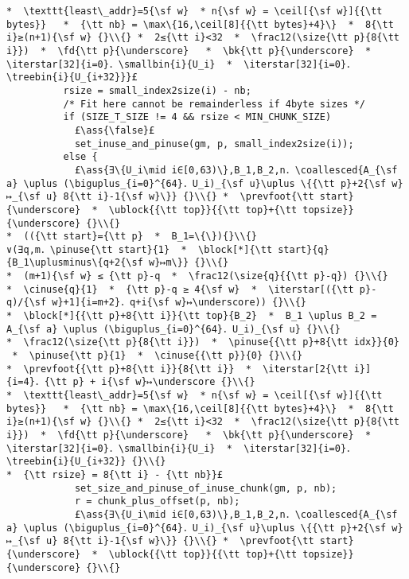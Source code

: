 \documentclass[10pt,twoside]{report}
\makeatletter
\newcommand{\ml}[2][t]{\mbox{\mdseries\begin{tabular}[#1]{@{}L@{}}#2\end{tabular}}}
\newcommand{\ass}[1]{\ensuremath{{\color{blue}\left\{\ml[c]{#1}\right\}}}}
\renewcommand{\ceil}[2][]{\left\lceil{#2}\right\rceil_{#1}}
\newcommand{\iterstar}[2][]{\text{\LARGE $*$}^{#1}_{#2}}
\makeatother
\begin{document}
\begin{lstlisting}
*  \texttt{least\_addr}=5{\sf w}  * n{\sf w} = \ceil[{\sf w}]{{\tt bytes}}   *  {\tt nb} = \max\{16,\ceil[8]{{\tt bytes}+4}\}  *  8{\tt i}≥(n+1){\sf w} {}\\{} *  2≤{\tt i}<32  *  \frac12(\size{\tt p}{8{\tt i}})  *  \fd{\tt p}{\underscore}   *  \bk{\tt p}{\underscore}  *  \iterstar[32]{i=0}．\smallbin{i}{U_i}  *  \iterstar[32]{i=0}．\treebin{i}{U_{i+32}}}£ 
          rsize = small_index2size(i) - nb;
          /* Fit here cannot be remainderless if 4byte sizes */
          if (SIZE_T_SIZE != 4 && rsize < MIN_CHUNK_SIZE)
            £\ass{\false}£
            set_inuse_and_pinuse(gm, p, small_index2size(i));
          else {
            £\ass{∃\{U_i\mid i∈[0,63)\},B_1,B_2,n．\coallesced{A_{\sf a} \uplus (\biguplus_{i=0}^{64}．U_i)_{\sf u}\uplus \{{\tt p}+2{\sf w}↦_{\sf u} 8{\tt i}-1{\sf w}\}} {}\\{} *  \prevfoot{\tt start}{\underscore}  *  \ublock{{\tt top}}{{\tt top}+{\tt topsize}}{\underscore} {}\\{}
*  (({\tt start}={\tt p}  *  B_1=\{\}){}\\{}
∨(∃q,m．\pinuse{\tt start}{1}  *  \block[*]{\tt start}{q}{B_1\uplusminus\{q+2{\sf w}↦m\}} {}\\{}
*  (m+1){\sf w} ≤ {\tt p}-q  *  \frac12(\size{q}{{\tt p}-q}) {}\\{}
*  \cinuse{q}{1}  *  {\tt p}-q ≥ 4{\sf w}  *  \iterstar[({\tt p}-q)/{\sf w}+1]{i=m+2}．q+i{\sf w}↦\underscore)) {}\\{}
*  \block[*]{{\tt p}+8{\tt i}}{\tt top}{B_2}  *  B_1 \uplus B_2 = A_{\sf a} \uplus (\biguplus_{i=0}^{64}．U_i)_{\sf u} {}\\{}
*  \frac12(\size{\tt p}{8{\tt i}})  *  \pinuse{{\tt p}+8{\tt idx}}{0}  *  \pinuse{\tt p}{1}  *  \cinuse{{\tt p}}{0} {}\\{}
*  \prevfoot{{\tt p}+8{\tt i}}{8{\tt i}}  *  \iterstar[2{\tt i}]{i=4}．{\tt p} + i{\sf w}↦\underscore {}\\{}
*  \texttt{least\_addr}=5{\sf w}  * n{\sf w} = \ceil[{\sf w}]{{\tt bytes}}   *  {\tt nb} = \max\{16,\ceil[8]{{\tt bytes}+4}\}  *  8{\tt i}≥(n+1){\sf w} {}\\{} *  2≤{\tt i}<32  *  \frac12(\size{\tt p}{8{\tt i}})  *  \fd{\tt p}{\underscore}   *  \bk{\tt p}{\underscore}  *  \iterstar[32]{i=0}．\smallbin{i}{U_i}  *  \iterstar[32]{i=0}．\treebin{i}{U_{i+32}} {}\\{}
*  {\tt rsize} = 8{\tt i} - {\tt nb}}£ 
            set_size_and_pinuse_of_inuse_chunk(gm, p, nb);
            r = chunk_plus_offset(p, nb);
            £\ass{∃\{U_i\mid i∈[0,63)\},B_1,B_2,n．\coallesced{A_{\sf a} \uplus (\biguplus_{i=0}^{64}．U_i)_{\sf u}\uplus \{{\tt p}+2{\sf w}↦_{\sf u} 8{\tt i}-1{\sf w}\}} {}\\{} *  \prevfoot{\tt start}{\underscore}  *  \ublock{{\tt top}}{{\tt top}+{\tt topsize}}{\underscore} {}\\{}

\end{lstlisting}
\end{document}
